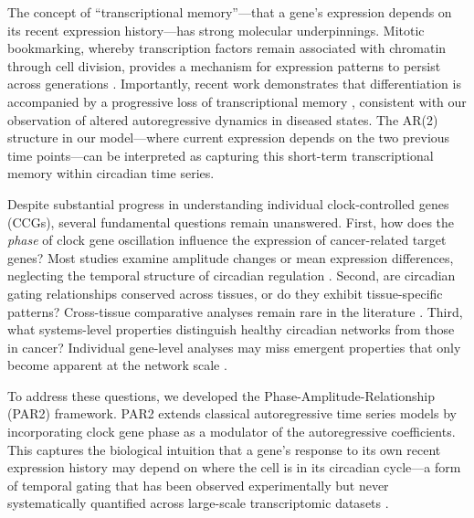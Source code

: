 \documentclass[11pt,a4paper]{article}
\begin{document}
The concept of ``transcriptional memory''---that a gene's expression depends on its recent expression history---has strong molecular underpinnings. Mitotic bookmarking, whereby transcription factors remain associated with chromatin through cell division, provides a mechanism for expression patterns to persist across generations \citep{zaidi2010mitotic, zhu2023mitotic}. Importantly, recent work demonstrates that differentiation is accompanied by a progressive loss of transcriptional memory \citep{bmcbiol2024memory}, consistent with our observation of altered autoregressive dynamics in diseased states. The AR(2) structure in our model---where current expression depends on the two previous time points---can be interpreted as capturing this short-term transcriptional memory within circadian time series.

Despite substantial progress in understanding individual clock-controlled genes (CCGs), several fundamental questions remain unanswered. First, how does the \textit{phase} of clock gene oscillation influence the expression of cancer-related target genes? Most studies examine amplitude changes or mean expression differences, neglecting the temporal structure of circadian regulation \citep{zhang2014circadian}. Second, are circadian gating relationships conserved across tissues, or do they exhibit tissue-specific patterns? Cross-tissue comparative analyses remain rare in the literature \citep{zhang2014circadian, mure2018diurnal}. Third, what systems-level properties distinguish healthy circadian networks from those in cancer? Individual gene-level analyses may miss emergent properties that only become apparent at the network scale \citep{barabasi2011network, koike2012transcriptional}.

To address these questions, we developed the Phase-Amplitude-Relationship (PAR2) framework. PAR2 extends classical autoregressive time series models by incorporating clock gene phase as a modulator of the autoregressive coefficients. This captures the biological intuition that a gene's response to its own recent expression history may depend on where the cell is in its circadian cycle---a form of temporal gating that has been observed experimentally but never systematically quantified across large-scale transcriptomic datasets \citep{menet2012nascent, koike2012transcriptional}.
\end{document}
